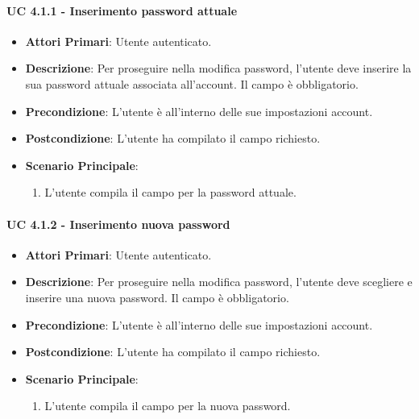 				\paragraph{UC 4.1.1 - Inserimento password attuale}
				\begin{itemize}
					\item \textbf{Attori Primari}: Utente autenticato.
					\item \textbf{Descrizione}: Per proseguire nella modifica password, l'utente deve inserire la sua password attuale associata all'account. Il campo è obbligatorio.
					\item \textbf{Precondizione}: L'utente è all'interno delle sue impostazioni account.
					\item \textbf{Postcondizione}: L'utente ha compilato il campo richiesto.
					\item \textbf{Scenario Principale}:
					\begin{enumerate}
						\item L'utente compila il campo per la password attuale.
					\end{enumerate}
				\end{itemize}

				\paragraph{UC 4.1.2 - Inserimento nuova password}
				\begin{itemize}
					\item \textbf{Attori Primari}: Utente autenticato.
					\item \textbf{Descrizione}: Per proseguire nella modifica password, l'utente deve scegliere e inserire una nuova password. Il campo è obbligatorio.
					\item \textbf{Precondizione}: L'utente è all'interno delle sue impostazioni account.
					\item \textbf{Postcondizione}: L'utente ha compilato il campo richiesto.
					\item \textbf{Scenario Principale}:
					\begin{enumerate}
						\item L'utente compila il campo per la nuova password.
					\end{enumerate}
				\end{itemize}

